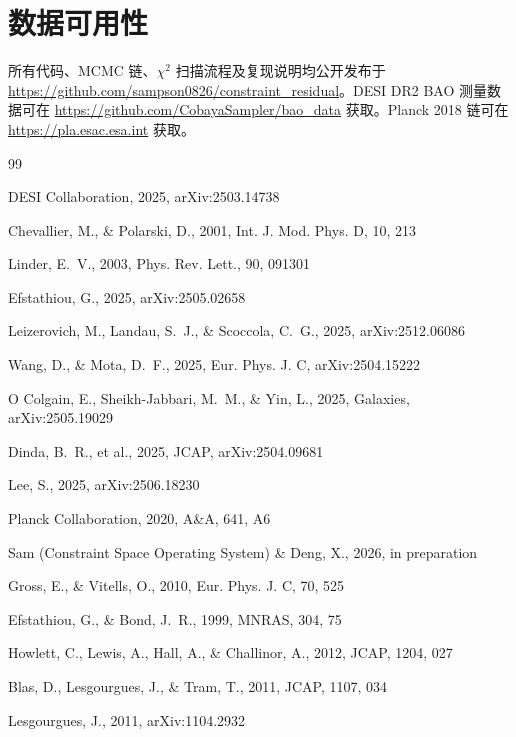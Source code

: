\documentclass[12pt]{ctexart}
\begin{document}
\section*{数据可用性}

所有代码、MCMC 链、$\chi^2$ 扫描流程及复现说明均公开发布于 \url{https://github.com/sampson0826/constraint_residual}。DESI DR2 BAO 测量数据可在 \url{https://github.com/CobayaSampler/bao_data} 获取。Planck 2018 链可在 \url{https://pla.esac.esa.int} 获取。

\begin{thebibliography}{99}

DESI Collaboration, 2025, arXiv:2503.14738

Chevallier, M., \& Polarski, D., 2001, Int. J. Mod. Phys. D, 10, 213

Linder, E.~V., 2003, Phys. Rev. Lett., 90, 091301

Efstathiou, G., 2025, arXiv:2505.02658

Leizerovich, M., Landau, S.~J., \& Scoccola, C.~G., 2025, arXiv:2512.06086

Wang, D., \& Mota, D.~F., 2025, Eur. Phys. J. C, arXiv:2504.15222

O Colgain, E., Sheikh-Jabbari, M.~M., \& Yin, L., 2025, Galaxies, arXiv:2505.19029

Dinda, B.~R., et al., 2025, JCAP, arXiv:2504.09681

Lee, S., 2025, arXiv:2506.18230

Planck Collaboration, 2020, A\&A, 641, A6

Sam (Constraint Space Operating System) \& Deng, X., 2026, in preparation

Gross, E., \& Vitells, O., 2010, Eur. Phys. J. C, 70, 525

Efstathiou, G., \& Bond, J.~R., 1999, MNRAS, 304, 75

Howlett, C., Lewis, A., Hall, A., \& Challinor, A., 2012, JCAP, 1204, 027

Blas, D., Lesgourgues, J., \& Tram, T., 2011, JCAP, 1107, 034

Lesgourgues, J., 2011, arXiv:1104.2932

\end{thebibliography}
\end{document}
